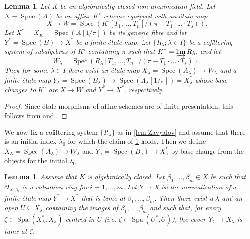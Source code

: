\documentclass[a4paper,twoside,11pt,reqno]{amsart}
\newcommand{\cO}{{\mathcal O}}
\DeclareMathOperator{\Spec}{Spec}
\DeclareMathOperator{\Spa}{Spa}
\newcommand{\stacks}[2][Tag]{\cite[\href{https://stacks.math.columbia.edu/tag/#2}{#1~#2}]{StacksProject}}
\newtheorem{lem}[thm]{Lemma}
\theoremstyle{definition}
\numberwithin{equation}{subsection}
\begin{document}
\begin{lem}  
\label{lem:straightforward-approx}
    Let $K$ be an algebraically closed non-archimedean field. Let $X=\Spec(A)$ be an affine $K^\circ$-scheme equipped with an \'etale map
    \[ 
        X\longrightarrow W = \Spec(K^\circ[T_1, \dots, T_n]/(\pi- T_1\cdot\ldots\cdot T_s)).
    \]
    Let $X^* = X_K = \Spec(A[1/\pi])$ be its generic fibre and let $Y^*=\Spec(B)\to X^*$ be a finite \'etale map. Let $\{R_\lambda; \lambda \in I\}$ be a cofiltering system of subalgebras of $K^\circ$ containing $\pi$ such that $K^\circ=\varinjlim R_\lambda$, 
    and let
    \[
        W_\lambda = \Spec(R_\lambda[T_1, \dots, T_n]/(\pi- T_1\cdot\ldots\cdot T_s)).
    \]
    Then for some $\lambda\in I$ there exist an \'etale map $X_\lambda=\Spec(A_\lambda)\to W_\lambda$ and a finite \'etale map $Y_\lambda=\Spec(B_\lambda)\to \Spec(A_\lambda[1/\pi]) = X^*_\lambda$ whose base changes to $K^\circ$ are $X\to W$ and $Y^*\to X^*$, respectively.
\end{lem}

\begin{proof}
Since \'etale morphisms of affine schemes are of finite presentation, this follows from \cite[8.8.2 and 8.10.5(viii,x)]{EGAIV3} and \stacks[Lemma]{07RP}.
\end{proof}

We now fix a cofiltering system $\{R_\lambda\}$ as in \cref{lem:Zavyalov} and assume that there is an initial index $\lambda_0$ for which the claim of \cref{lem:straightforward-approx} holds. Then we define $X_\lambda = \Spec(A_\lambda) \to W_\lambda$ and $Y_\lambda = \Spec(B_\lambda) \to X_\lambda^*$ by base change from the objects for the initial $\lambda_0$. 

\begin{lem}
\label{lem:locus of tameness}
     Assume that $K$ is algebraically closed. 
Let $\beta_1, \ldots, \beta_m \in X$ be such that $\cO_{X,\beta_i}$ is a valuation ring for $i =1, \ldots, m$. Let $Y \to X$ be the normalisation of a finite \'etale map $Y^* \to X^*$ that is tame at $\beta_1, \ldots, \beta_m$. Then there exist a $\lambda$ and an open $U \subseteq X_\lambda$ containing the images of $\beta_1, \ldots, \beta_m$ and such that, for every $\zeta \in \Spa(X_\lambda^*, X_\lambda)$ centred in $U$ (i.e. $\zeta \in \Spa(U^*,U)$), the cover $Y_\lambda \to X_\lambda$ is tame at $\zeta$. 
\end{lem}
\end{document}
